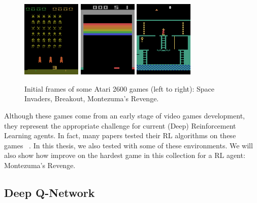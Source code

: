 \begin{figure}
	\centering
	\includegraphics[width=0.25\textwidth]{./imgs/si0.png}
	\quad
	\includegraphics[width=0.25\textwidth]{./imgs/br0.png}
	\quad
	\includegraphics[width=0.25\textwidth]{./imgs/mz0.png}
	\caption{Initial frames of some Atari 2600 games (left to right): Space
		Invaders, Breakout, Montezuma's Revenge.}
	\label{fig:atari-frames}
\end{figure}

Although these games come from an early stage of video games development, they
represent the appropriate challenge for current (Deep) Reinforcement Learning
agents. In fact, many papers tested their RL algorithms on these
games~\cite{bib:atari-deeprl}%
\cite{bib:atari-deepq-nature}\cite{bib:double-q}\cite{bib:rainbow}.
In this thesis, we also tested with some of these environments. We will also
show how improve on the hardest game in this collection for a RL agent:
Montezuma's Revenge.


\subsection{Deep Q-Network}

